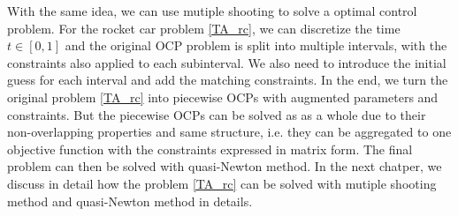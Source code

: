 With the same idea, we can use mutiple shooting to solve a optimal control problem. For the rocket car problem \ref{TA_rc}, we can discretize the time $t \in [0, 1]$ and the original OCP problem is split into multiple intervals, with the constraints also applied to each subinterval. We also need to introduce the initial guess for each interval and add the matching constraints. In the end, we turn the original problem  \ref{TA_rc} into piecewise OCPs with augmented parameters and constraints. But the piecewise OCPs can be solved as as a whole due to their non-overlapping properties and same structure, i.e. they can be aggregated to one objective function with the constraints expressed in matrix form. The final problem can then be solved with quasi-Newton method. In the next chatper, we discuss in detail how the problem \ref{TA_rc} can be solved with mutiple shooting method and quasi-Newton method in details. 








% 






